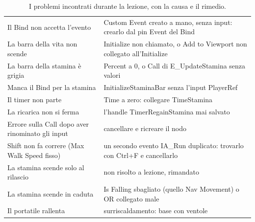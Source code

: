 \begin{table}[htbp]
\begin{tabular}{@{}p{5.4cm}p{8.6cm}@{}}
Il Bind non accetta l'evento & Custom Event creato a mano, senza input: crearlo dal pin
Event del Bind \\
La barra della vita non scende & Initialize non chiamato, o Add to Viewport non collegato
all'Initialize \\
La barra della stamina è grigia & Percent a 0, o Call di E\_UpdateStamina senza valori \\
Manca il Bind per la stamina & InitializeStaminaBar senza l'input PlayerRef \\
Il timer non parte & Time a zero: collegare TimeStamina \\
La ricarica non si ferma & l'handle TimerRegainStamina mai salvato \\
Errore sulla Call dopo aver rinominato gli input & cancellare e ricreare il nodo \\
Shift non fa correre (Max Walk Speed fisso) & un secondo evento IA\_Run duplicato: trovarlo
con Ctrl+F e cancellarlo \\
La stamina scende solo al rilascio & non risolto a lezione, rimandato \\
La stamina scende in caduta & Is Falling sbagliato (quello Nav Movement) o OR collegato
male \\
Il portatile rallenta & surriscaldamento: base con ventole \\
\bottomrule
\end{tabular}
\caption{I problemi incontrati durante la lezione, con la causa e il rimedio.}
\label{ue11:tab:errori}
\end{table}

